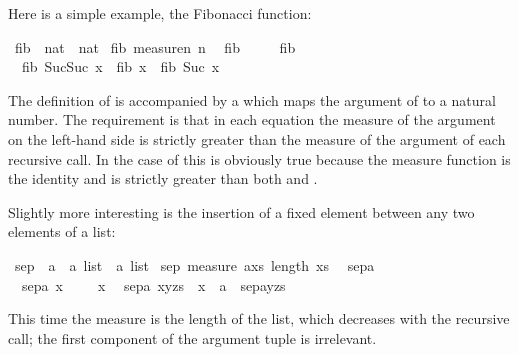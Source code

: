 %
\begin{isabellebody}%
%
\begin{isamarkuptext}%
Here is a simple example, the Fibonacci function:%
\end{isamarkuptext}%
\ fib\ {\isacharcolon}{\isacharcolon}\ {\isachardoublequote}nat\ {\isasymRightarrow}\ nat{\isachardoublequote}\isanewline
{}\ fib\ {\isachardoublequote}measure{\isacharparenleft}{\isasymlambda}n{\isachardot}\ n{\isacharparenright}{\isachardoublequote}\isanewline
\ \ {\isachardoublequote}fib\ \ {\isacharequal}\ \isanewline
\ \ {\isachardoublequote}fib\ \ {\isacharequal}\ \isanewline
\ \ {\isachardoublequote}fib\ {\isacharparenleft}Suc{\isacharparenleft}Suc\ x{\isacharparenright}{\isacharparenright}\ {\isacharequal}\ fib\ x\ {\isacharplus}\ fib\ {\isacharparenleft}Suc\ x{\isacharparenright}{\isachardoublequote}%
\begin{isamarkuptext}%
\noindent
The definition of  is accompanied by a 
 which maps the argument of  to a
natural number. The requirement is that in each equation the measure of the
argument on the left-hand side is strictly greater than the measure of the
argument of each recursive call. In the case of  this is
obviously true because the measure function is the identity and
 is strictly greater than both  and
.

Slightly more interesting is the insertion of a fixed element
between any two elements of a list:%
\end{isamarkuptext}%
\ sep\ {\isacharcolon}{\isacharcolon}\ {\isachardoublequote}{\isacharprime}a\ {\isacharasterisk}\ {\isacharprime}a\ list\ {\isasymRightarrow}\ {\isacharprime}a\ list{\isachardoublequote}\isanewline
{}\ sep\ {\isachardoublequote}measure\ {\isacharparenleft}{\isasymlambda}{\isacharparenleft}a{\isacharcomma}xs{\isacharparenright}{\isachardot}\ length\ xs{\isacharparenright}{\isachardoublequote}\isanewline
\ \ {\isachardoublequote}sep{\isacharparenleft}a{\isacharcomma}\ {\isacharbrackleft}{\isacharbrackright}{\isacharparenright}\ \ \ \ \ {\isacharequal}\ {\isacharbrackleft}{\isacharbrackright}{\isachardoublequote}\isanewline
\ \ {\isachardoublequote}sep{\isacharparenleft}a{\isacharcomma}\ {\isacharbrackleft}x{\isacharbrackright}{\isacharparenright}\ \ \ \ {\isacharequal}\ {\isacharbrackleft}x{\isacharbrackright}{\isachardoublequote}\isanewline
\ \ {\isachardoublequote}sep{\isacharparenleft}a{\isacharcomma}\ x{\isacharhash}y{\isacharhash}zs{\isacharparenright}\ {\isacharequal}\ x\ {\isacharhash}\ a\ {\isacharhash}\ sep{\isacharparenleft}a{\isacharcomma}y{\isacharhash}zs{\isacharparenright}{\isachardoublequote}%
\begin{isamarkuptext}%
\noindent
This time the measure is the length of the list, which decreases with the
recursive call; the first component of the argument tuple is irrelevant.


\end{isamarkuptext}
\end{isabellebody}
